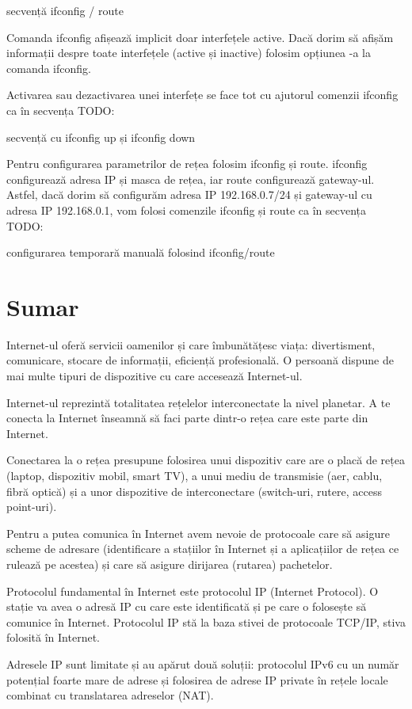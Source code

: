 secvență ifconfig / route

Comanda ifconfig afișează implicit doar interfețele active. Dacă dorim să afișăm informații despre toate interfețele (active și inactive) folosim opțiunea -a la comanda ifconfig.

Activarea sau dezactivarea unei interfețe se face tot cu ajutorul comenzii ifconfig ca în secvența TODO:

secvență cu ifconfig up și ifconfig down

Pentru configurarea parametrilor de rețea folosim ifconfig și route. ifconfig configurează adresa IP și masca de rețea, iar route configurează gateway-ul. Astfel, dacă dorim să configurăm adresa IP 192.168.0.7/24 și gateway-ul cu adresa IP 192.168.0.1, vom folosi comenzile ifconfig și route ca în secvența TODO:

configurarea temporară manuală folosind ifconfig/route

\section{Sumar}
\label{sec:net:summary}

Internet-ul oferă servicii oamenilor și care îmbunătățesc viața: divertisment, comunicare, stocare de informații, eficiență profesională. O persoană dispune de mai multe tipuri de dispozitive cu care accesează Internet-ul.

Internet-ul reprezintă totalitatea rețelelor interconectate la nivel planetar. A te conecta la Internet înseamnă să faci parte dintr-o rețea care este parte din Internet.

Conectarea la o rețea presupune folosirea unui dispozitiv care are o placă de rețea (laptop, dispozitiv mobil, smart TV), a unui mediu de transmisie (aer, cablu, fibră optică) și a unor dispozitive de interconectare (switch-uri, rutere, access point-uri).

Pentru a putea comunica în Internet avem nevoie de protocoale care să asigure scheme de adresare (identificare a stațiilor în Internet și a aplicațiilor de rețea ce rulează pe acestea) și care să asigure dirijarea (rutarea) pachetelor.

Protocolul fundamental în Internet este protocolul IP (Internet Protocol). O stație va avea o adresă IP cu care este identificată și pe care o folosește să comunice în Internet. Protocolul IP stă la baza stivei de protocoale TCP/IP, stiva folosită în Internet.

Adresele IP sunt limitate și au apărut două soluții: protocolul IPv6 cu un număr potențial foarte mare de adrese și folosirea de adrese IP private în rețele locale combinat cu translatarea adreselor (NAT).


